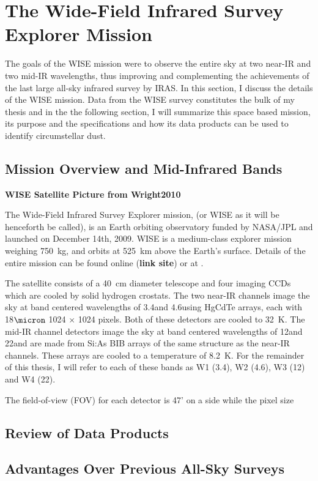 \section{The Wide-Field Infrared Survey Explorer Mission}

    The goals of the WISE mission were to observe the entire sky at two near-IR and two mid-IR wavelengths, thus improving and complementing the achievements of the last large all-sky infrared survey by IRAS. In this section, I discuss the details of the WISE mission. Data from the WISE survey constitutes the bulk of my thesis and in the the following section, I will summarize this space based mission, its purpose and the specifications and how its data products can be used to identify circumstellar dust.
   

\subsection{Mission Overview and Mid-Infrared Bands}

\textbf{WISE Satellite Picture from Wright2010\label{fig:wise_sat}}

    The Wide-Field Infrared Survey Explorer mission, (or WISE as it will be henceforth be called), is an Earth orbiting observatory funded by NASA/JPL and launched on December 14th, 2009. WISE is a medium-class explorer mission weighing 750~kg, and orbits at 525~km above the Earth's surface. Details of the entire mission can be found online (\textbf{link site}) or at \citep{Wright2010}. 

   The satellite consists of a 40~cm diameter telescope and four imaging CCDs which are cooled by solid hydrogen crostats. The two near-IR channels image the sky at band centered wavelengths of 3.4\micron and 4.6\micron using HgCdTe arrays, each with 18$\micron$ 1024 $\times$ 1024 pixels. Both of these detectors are cooled to 32~K. The mid-IR channel detectors image the sky at band centered wavelengths of 12\micron and 22\micron and are made from Si:As BIB arrays of the same structure as the near-IR channels. These arrays are cooled to a temperature of 8.2~K. For the remainder of this thesis, I will refer to each of these bands as W1 (3.4\micron), W2 (4.6\micron), W3 (12\micron) and W4 (22\micron). 
   
   The field-of-view (FOV) for each detector is 47' on a side while the pixel size 


\subsection{Review of Data Products}


\subsection{Advantages Over Previous All-Sky Surveys}